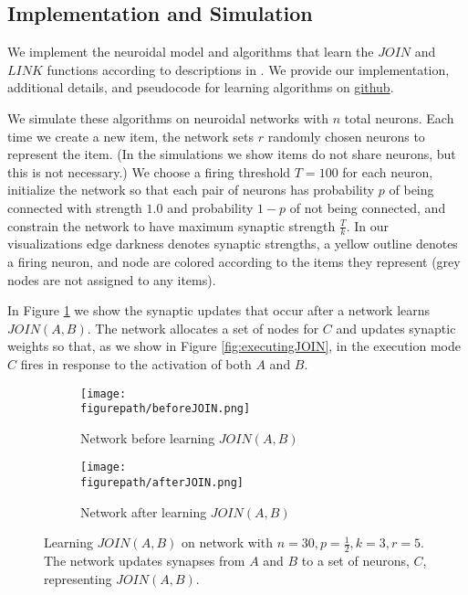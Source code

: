 \documentclass[letterpaper, 12pt]{article}
\newcommand{\figurepath}{../../Figures}
\begin{document}
\subsection{Implementation and Simulation}
We implement the neuroidal model and algorithms that learn the $JOIN$ and $LINK$ functions according to descriptions in \cite{valiant_memorization_2005}. We provide our implementation, additional details, and pseudocode for learning algorithms on \href{https://github.com/cchen23/neuroidal_model_project/tree/master/Code}{github}.

We simulate these algorithms on neuroidal networks with $n$ total neurons. Each time we create a new item, the network sets $r$ randomly chosen neurons to represent the item. (In the simulations we show items do not share neurons, but this is not necessary.) We choose a firing threshold $T=100$ for each neuron, initialize the network so that each pair of neurons has probability $p$ of being connected with strength $1.0$ and probability $1-p$ of not being connected, and constrain the network to have maximum synaptic strength $\frac{T}{k}$. In our visualizations edge darkness denotes synaptic strengths, a yellow outline denotes a firing neuron, and node are colored according to the items they represent (grey nodes are not assigned to any items).

In Figure \ref{fig:learningJOIN} we show the synaptic updates that occur after a network learns $JOIN(A,B)$. The network allocates a set of nodes for $C$ and updates synaptic weights so that, as we show in Figure \ref{fig:executingJOIN}, in the execution mode $C$ fires in response to the activation of both $A$ and $B$.

\begin{figure}[!htb]
\centering
\begin{subfigure}[b]{0.45\textwidth}
      \texttt{[image: \\figurepath/beforeJOIN.png]}
      \caption*{Network before learning $JOIN(A,B)$}
\end{subfigure}
\begin{subfigure}[b]{0.45\textwidth}
      \texttt{[image: \\figurepath/afterJOIN.png]}
      \caption*{Network after learning $JOIN(A,B)$}
\end{subfigure}
\caption{Learning $JOIN(A,B)$ on network with $n=30,p=\frac{1}{2},k=3,r=5$. The network updates synapses from $A$ and $B$ to a set of neurons, $C$, representing $JOIN(A,B)$.}\label{fig:learningJOIN}
\end{figure}
\end{document}
